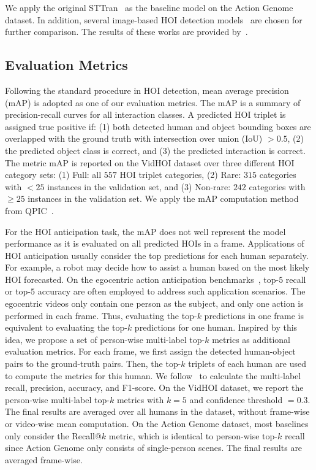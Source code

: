 \documentclass[times,twocolumn,final,authoryear]{elsarticle}
\begin{document}
We apply the original STTran~\citep{hoi_v2:sttran} as the baseline model on the Action Genome dataset. In addition, several image-based HOI detection models~\citep{hoi_i2:language_prior, hoi_i2:msdn, hoi_i2:vctree, hoi_i2:reidn, hoi_i2:gpsnet} are chosen for further comparison. The results of these works are provided by~\citep{hoi_v2:sttran}.  

\subsection{Evaluation Metrics}
Following the standard procedure in HOI detection, mean average precision (mAP) is adopted as one of our evaluation metrics. The mAP is a summary of precision-recall curves for all interaction classes. A predicted HOI triplet is assigned true positive if: (1) both detected human and object bounding boxes are overlapped with the ground truth with intersection over union (IoU) $>0.5$, (2) the predicted object class is correct, and (3) the predicted interaction is correct. The metric mAP is reported on the VidHOI dataset over three different HOI category sets: (1) Full: all $557$ HOI triplet categories, (2) Rare: $315$ categories with $<25$ instances in the validation set, and (3) Non-rare: $242$ categories with $\geq 25$ instances in the validation set. We apply the mAP computation method from QPIC~\citep{hoi_i1:qpic}.





For the HOI anticipation task, the mAP does not well represent the model performance as it is evaluated on all predicted HOIs in a frame. Applications of HOI anticipation usually consider the top predictions for each human separately. For example, a robot may decide how to assist a human based on the most likely HOI forecasted. On the egocentric action anticipation benchmarks~\citep{ego_set:epic100, ego_set:epic55, ego_set:egteagaze}, top-$5$ recall or top-$5$ accuracy are often employed to address such application scenarios. The egocentric videos only contain one person as the subject, and only one action is performed in each frame. Thus, evaluating the top-$k$ predictions in one frame is equivalent to evaluating the top-$k$ predictions for one human. Inspired by this idea, we propose a set of person-wise multi-label top-$k$ metrics as additional evaluation metrics. For each frame, we first assign the detected human-object pairs to the ground-truth pairs. Then, the top-$k$ triplets of each human are used to compute the metrics for this human. We follow~\citep{metric:multi_label} to calculate the multi-label recall, precision, accuracy, and F1-score. On the VidHOI dataset, we report the person-wise multi-label top-$k$ metrics with $k=5$ and confidence threshold $=0.3$. The final results are averaged over all humans in the dataset, without frame-wise or video-wise mean computation. On the Action Genome dataset, most baselines only consider the Recall@$k$ metric, which is identical to person-wise top-$k$ recall since Action Genome only consists of single-person scenes. The final results are averaged frame-wise. 
\end{document}
